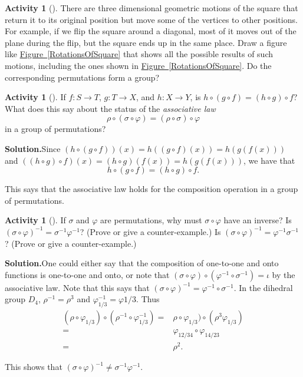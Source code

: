 \documentclass[10pt,]{book}
\theoremstyle{plain}
\theoremstyle{definition}
\newtheorem{activity}[project]{Activity}
\numberwithin{equation}{chapter}
\newcommand{\amp}{&}
\begin{document}
\begin{activity}[]\label{dihedral1}
There are three dimensional geometric motions of the square that return it to its original position but move some of the vertices to other positions. For example, if we flip the square around a diagonal, most of it moves out of the plane during the flip, but the square ends up in the same place. Draw a figure like \hyperref[RotationsOfSquare]{Figure~\ref{RotationsOfSquare}} that shows all the possible results of such motions, including the ones shown in \hyperref[RotationsOfSquare]{Figure~\ref{RotationsOfSquare}}. Do the corresponding permutations form a group?%
\end{activity}
\begin{activity}[]\label{activity-244}
If \(f:S\rightarrow T\), \(g:T\rightarrow X\), and \(h:X \rightarrow Y\), is \(h\circ(g\circ f) = (h\circ g)\circ f\)? What does this say about the status of the \emph{associative law}%
\begin{equation*}
\rho\circ(\sigma\circ \varphi) = (\rho\circ \sigma)\circ\varphi
\end{equation*}
in a group of permutations?%
\par\medskip\noindent%
\textbf{Solution.}\quad Since \((h\circ(g\circ f)) (x) = h((g\circ f)(x)) = h(g(f(x)))\) and \(((h\circ
g)\circ f) (x) = (h\circ g)(f(x)) = h(g(f(x)))\), we have that%
\begin{equation*}
h\circ (g\circ f) =
(h\circ g)\circ f.
\end{equation*}
%
\par
This says that the associative law holds for the composition operation in a group of permutations.%
\end{activity}
\begin{activity}[]\label{activity-245}
If \(\sigma\) and \(\varphi\) are permutations, why must \(\sigma\circ\varphi\) have an inverse? Is \((\sigma\circ\varphi)^{-1}=
\sigma^{-1}\varphi^{-1}\)? (Prove or give a counter-example.) Is \((\sigma\circ\varphi)^{-1}=
\varphi^{-1}\sigma^{-1}\)? (Prove or give a counter-example.)%
\par\medskip\noindent%
\textbf{Solution.}\quad One could either say that the composition of one-to-one and onto functions is one-to-one and onto, or note that \((\sigma\circ\varphi)\circ (\varphi^{-1}\circ
\sigma^{-1}) =\iota\) by the associative law. Note that this says that \((\sigma \circ
\varphi)^{-1}= \varphi^{-1}\circ \sigma^{-1}\). In the dihedral group \(D_4\), \(\rho^{-1}= \rho^3\) and \(\varphi_{1/3}^{-1} = \varphi{1/3}\). Thus%
\begin{align*}
(\rho\circ \varphi_{1/3})\circ (\rho^{-1}\circ
\varphi_{1/3}^{-1}) =\amp \rho\circ
\varphi_{1/3})\circ(\rho^3\varphi_{1/3})\\
=\amp \varphi_{12/34}\circ \varphi_{14/23}\\
=\amp \rho^2.
\end{align*}
%
\par
This shows that \((\sigma\circ\varphi)^{-1}\not=
\sigma^{-1}\varphi^{-1}\).%
\end{activity}
\end{document}
